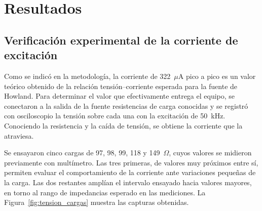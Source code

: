 \documentclass[12pt,a4paper]{article}
\begin{document}
\section{Resultados}
\label{sec:resultados}

\subsection{Verificación experimental de la corriente de excitación}
\label{sec:verificacion_corriente}

Como se indicó en la metodología, la corriente de 322~$\mu$A pico a pico es un valor teórico obtenido
de la relación tensión--corriente esperada para la fuente de Howland. Para determinar el valor que
efectivamente entrega el equipo, se conectaron a la salida de la fuente resistencias de carga
conocidas y se registró con osciloscopio la tensión sobre cada una con la excitación de 50~kHz.
Conociendo la resistencia y la caída de tensión, se obtiene la corriente que la atraviesa.

Se ensayaron cinco cargas de 97, 98, 99, 118 y 149~$\Omega$, cuyos valores se midieron previamente
con multímetro. Las tres primeras, de valores muy
próximos entre sí, permiten evaluar el comportamiento de la corriente ante variaciones pequeñas de
la carga. Las dos restantes amplían el intervalo ensayado hacia valores mayores, en torno al rango
de impedancias esperado en las mediciones. La Figura~\ref{fig:tension_cargas} muestra las capturas
obtenidas.
\end{document}
